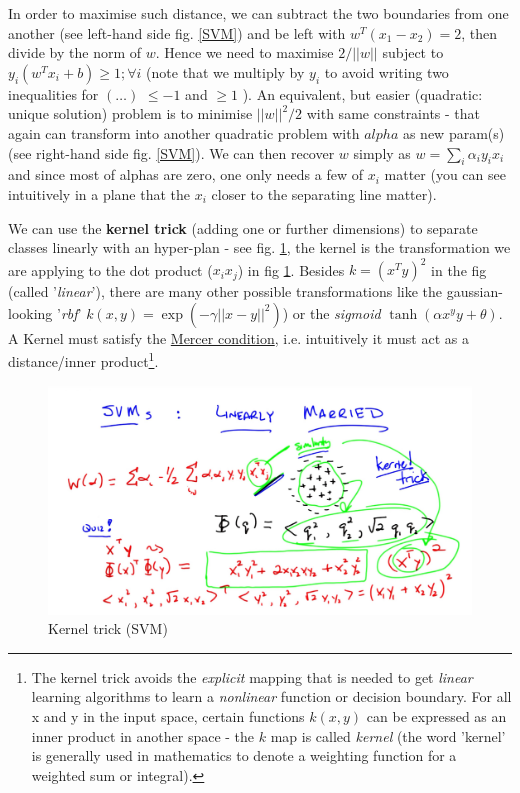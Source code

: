 \documentclass[11pt]{article}
\begin{document}
In order to maximise such distance, we can subtract the two boundaries from one another (see left-hand side fig. \ref{SVM}) and be left with $w^T (x_1-x_2) = 2$, then divide by the norm of $w$. Hence we need to maximise $2 /||w|| $ subject to $y_i (w^T x_i + b) \geq 1 ;\forall i$ (note that we multiply by $y_i$ to avoid writing two inequalities for $(\dots)$ $\leq -1$ and $\geq 1$ ). 
An equivalent, but easier (quadratic: unique solution) problem is to minimise $ ||w||^2 /2$ with same constraints - that again can transform into another quadratic problem with $alpha$ as new param(s) (see right-hand side fig. \ref{SVM}). We can then recover $w$ simply as $w=\sum_i \alpha_i y_i x_i$ and since most of alphas are zero, one only needs a few of $x_i$ matter (you can see intuitively in a plane that the $x_i$ closer to the separating line matter).

We can use the \textbf{kernel trick} (adding one or further dimensions) to separate classes linearly with an hyper-plan - see fig. \ref{kernel_trick}, the kernel is the transformation we are applying to the dot product ($x_i x_j$) in fig \ref{kernel_trick}. Besides $k = (x^T y)^2$ in the fig (called '\textit{linear}'), there are many other possible transformations like the gaussian-looking '\textit{rbf}' $k(x,y)= \exp(-\gamma ||x-y||^2)$) or the \textit{sigmoid} $\tanh(\alpha x^y y + \theta)$. A Kernel must satisfy the \underline{Mercer condition}, i.e. intuitively it must act as a distance/inner product\footnote{The kernel trick avoids the \textit{explicit} mapping that is needed to get \textit{linear} learning algorithms to learn a \textit{nonlinear} function or decision boundary. For all x and y in the input space, certain functions $k(x,y)$ can be expressed as an inner product in another space - the $k$ map is called \textit{kernel} (the word 'kernel' is generally used in mathematics to denote a weighting function for a weighted sum or integral).}. 

\begin{figure}[htbp] 
	\centering
	\includegraphics[width=.9\textwidth]{pics/kernel_trick}
	\caption{Kernel trick (SVM)} 
	\label{kernel_trick}
\end{figure}
\end{document}
